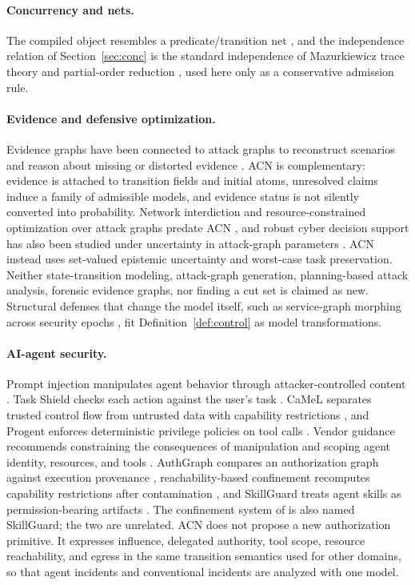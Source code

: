 \documentclass[11pt,letterpaper]{article}
\theoremstyle{definition}
\begin{document}
\paragraph{Concurrency and nets.} The compiled object resembles a predicate/transition net \cite{genrich1981}, and the independence relation of Section~\ref{sec:conc} is the standard independence of Mazurkiewicz trace theory and partial-order reduction \cite{mazurkiewicz1987,godefroid1996}, used here only as a conservative admission rule.

\paragraph{Evidence and defensive optimization.} Evidence graphs have been connected to attack graphs to reconstruct scenarios and reason about missing or distorted evidence \cite{liu2012evidence,liu2014evidence}. ACN is complementary: evidence is attached to transition fields and initial atoms, unresolved claims induce a family of admissible models, and evidence status is not silently converted into probability. Network interdiction and resource-constrained optimization over attack graphs predate ACN \cite{nandi2016,bhuiyan2021}, and robust cyber decision support has also been studied under uncertainty in attack-graph parameters \cite{zhang2025uncertainty}. ACN instead uses set-valued epistemic uncertainty and worst-case task preservation. Neither state-transition modeling, attack-graph generation, planning-based attack analysis, forensic evidence graphs, nor finding a cut set is claimed as new. Structural defenses that change the model itself, such as service-graph morphing across security epochs \cite{miam}, fit Definition~\ref{def:control} as model transformations.

\paragraph{AI-agent security.} Prompt injection manipulates agent behavior through attacker-controlled content \cite{openai2025,toolhijacker}. Task Shield checks each action against the user's task \cite{taskshield}. CaMeL separates trusted control flow from untrusted data with capability restrictions \cite{camel}, and Progent enforces deterministic privilege policies on tool calls \cite{progent}. Vendor guidance recommends constraining the consequences of manipulation \cite{openai2026} and scoping agent identity, resources, and tools \cite{microsoft2026}. AuthGraph compares an authorization graph against execution provenance \cite{authgraph}, reachability-based confinement recomputes capability restrictions after contamination \cite{xiong2026}, and SkillGuard treats agent skills as permission-bearing artifacts \cite{skillguard}. The confinement system of \cite{xiong2026} is also named SkillGuard; the two are unrelated. ACN does not propose a new authorization primitive. It expresses influence, delegated authority, tool scope, resource reachability, and egress in the same transition semantics used for other domains, so that agent incidents and conventional incidents are analyzed with one model.
\end{document}
